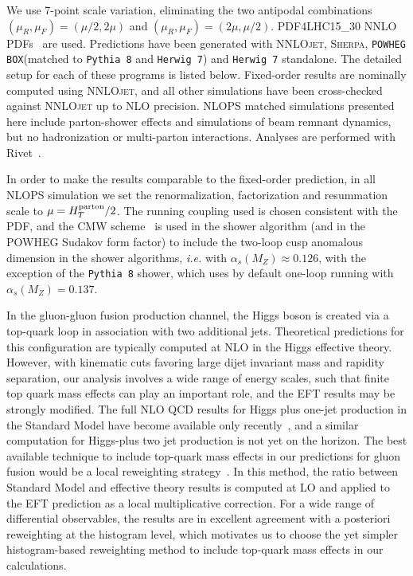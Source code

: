 \documentclass[10pt,prd,fleqn,superscriptaddress,notitlepage,nofootinbib,preprintnumbers,nobalancelastpage]{revtex4-1}
\newcommand{\NNLOJET}{\textsc{NNLOjet}\xspace}
\newcommand{\PWG}{\texttt{POWHEG BOX}\xspace}
\newcommand{\PY}{\texttt{Pythia 8}\xspace}
\newcommand{\HW}{\texttt{Herwig 7}\xspace}
\newcommand{\Sherpa}{\textsc{Sherpa}\xspace}
\begin{document}
We use 7-point scale variation, eliminating the two antipodal combinations $(\mu_R,\mu_F)=(\mu/2,2\mu)$ and $(\mu_R,\mu_F)=(2\mu,\mu/2)$. PDF4LHC15\_30 NNLO PDFs~\cite{Butterworth:2015oua} are used.
Predictions have been generated with \NNLOJET, \Sherpa, \PWG (matched to \PY and \HW) and \HW standalone. The detailed setup for each of these programs is listed below. Fixed-order results are nominally computed using \NNLOJET, and all other simulations have been cross-checked against \NNLOJET up to NLO precision.
NLOPS matched simulations presented here include parton-shower effects and simulations of beam remnant dynamics, but no hadronization or multi-parton interactions.
Analyses are performed with Rivet~\cite{Buckley:2010ar,Bierlich:2019rhm}.

In order to make the results comparable to the fixed-order prediction, in all NLOPS simulation we set the renormalization, factorization and resummation scale to $\mu=H_T^{\rm parton}/2$.
The running coupling used is chosen consistent with the PDF, and 
the CMW scheme~\cite{Catani:1990rr} is used in the shower algorithm (and in the POWHEG Sudakov form factor) to include the two-loop cusp anomalous dimension in the shower algorithms, \emph{i.e.} with $\alpha_s(M_Z)\approx0.126$, with the exception of the \PY shower, which uses by default one-loop running with $\alpha_s(M_Z)=0.137$.

In the gluon-gluon fusion production channel, the Higgs boson is created via a top-quark loop in association with two additional jets. Theoretical predictions for this configuration are typically computed at NLO in the Higgs effective theory. However, with kinematic cuts favoring large dijet invariant mass and rapidity separation, our analysis involves a wide range of energy scales, such that finite top quark mass effects can play an important role, and the EFT results may be strongly modified. The full NLO QCD results for Higgs plus one-jet production in the Standard Model have become available only recently~\cite{Lindert:2018iug,Jones:2018hbb}, and a similar computation for Higgs-plus two jet production is not yet on the horizon. The best available technique to include top-quark mass effects in our predictions for gluon fusion would be a local reweighting strategy~\cite{Buschmann:2014sia,Greiner:2016awe,NNLOJETSecDec}. In this method, the ratio between Standard Model and effective theory results is computed at LO and applied to the EFT prediction as a local multiplicative correction. For a wide range of differential observables, the results are in excellent agreement with a posteriori reweighting at the histogram level, which motivates us to choose the yet simpler histogram-based reweighting method to include top-quark mass effects in our calculations.
\end{document}
